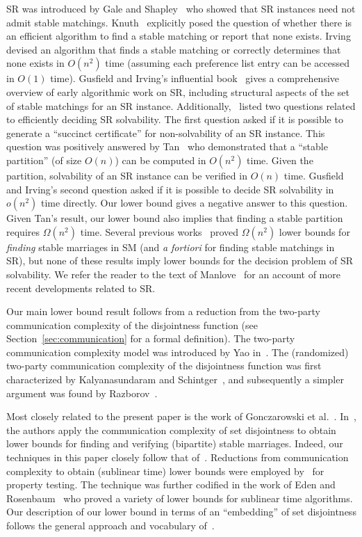 SR was introduced by Gale and Shapley~\cite{GS62} who showed that SR instances need not admit stable matchings. Knuth~\cite{Knuth76} explicitly posed the question of whether there is an efficient algorithm to find a stable matching or report that none exists. Irving~\cite{Irving1985-stable} devised an algorithm that finds a stable matching or correctly determines that none exists in $O(n^2)$ time (assuming each preference list entry can be accessed in $O(1)$ time). Gusfield and Irving's influential book~\cite{GI89} gives a comprehensive overview of early algorithmic work on SR, including structural aspects of the set of stable matchings for an SR instance. Additionally,~\cite{GI89} listed two questions related to efficiently deciding SR solvability. The first question asked if it is possible to generate a ``succinct certificate'' for non-solvability of an SR instance. This question was positively answered by Tan~\cite{Tan1991-necessary} who demonstrated that a ``stable partition'' (of size $O(n)$) can be computed in $O(n^2)$ time. Given the partition, solvability of an SR instance can be verified in $O(n)$ time. Gusfield and Irving's second question asked if it is possible to decide SR solvability in $o(n^2)$ time directly. Our lower bound gives a negative answer to this question. Given Tan's result, our lower bound also implies that finding a stable partition requires $\Omega(n^2)$ time. Several previous works~\cite{HN90,CL10,Segal03,Gonczarowski2019-stable} proved $\Omega(n^2)$ lower bounds for \emph{finding} stable marriages in SM (and \emph{a fortiori} for finding stable matchings in SR), but none of these results imply lower bounds for the decision problem of SR solvability. We refer the reader to the text of Manlove~\cite{Manlove2013-algorithmics} for an account of more recent developments related to SR.

Our main lower bound result follows from a reduction from the two-party communication complexity of the disjointness function (see Section~\ref{sec:communication} for a formal definition). The two-party communication complexity model was introduced by Yao in~\cite{Yao79}. The (randomized) two-party communication complexity of the disjointness function was first characterized by Kalyanasundaram and Schintger~\cite{KS92}, and subsequently a simpler argument was found by Razborov~\cite{Razborov92}. 

Most closely related to the present paper is the work of Gonczarowski et al.~\cite{Gonczarowski2019-stable}. In~\cite{Gonczarowski2019-stable}, the authors apply the communication complexity of set disjointness to obtain lower bounds for finding and verifying (bipartite) stable marriages. Indeed, our techniques in this paper closely follow that of~\cite{Gonczarowski2019-stable}. Reductions from communication complexity to obtain (sublinear time) lower bounds were employed by~\cite{Blais2012-property} for property testing. The technique was further codified in the work of Eden and Rosenbaum~\cite{Eden2018-lower} who proved a variety of lower bounds for sublinear time algorithms. Our description of our lower bound in terms of an ``embedding'' of set disjointness follows the general approach and vocabulary of~\cite{Eden2018-lower}.